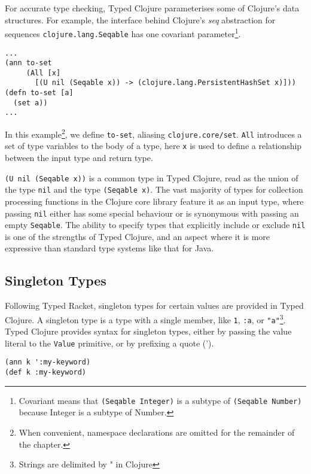 For accurate type checking, Typed Clojure parameterises some of Clojure's data structures. For example,
the interface behind Clojure's \emph{seq} abstraction for sequences \lstinline|clojure.lang.Seqable| has one 
covariant parameter\footnote{Covariant means that \lstinline|(Seqable Integer)| is a subtype of \lstinline|(Seqable Number)|
because Integer is a subtype of Number.}.

\begin{lstlisting}[caption=Polymorphism in Typed Clojure]
...
(ann to-set 
     (All [x]
       [(U nil (Seqable x)) -> (clojure.lang.PersistentHashSet x)]))
(defn to-set [a]
  (set a))
...
\end{lstlisting}

In this example\footnote{When convenient, namespace declarations are omitted for the remainder of the chapter.}, 
we define \lstinline|to-set|, aliasing \lstinline|clojure.core/set|.
\lstinline|All| introduces a set of type variables to the body of a type,
here \lstinline|x| is used to define a relationship between the input type and return type.

\lstinline|(U nil (Seqable x))| is a common type in Typed Clojure, read as the union
of the type \lstinline|nil| and the type \lstinline|(Seqable x)|.
The vast majority of types for collection processing functions in the Clojure core library feature
it as an input type, where passing \lstinline|nil| either has some special behaviour 
or is synonymous with passing an empty \lstinline|Seqable|.
The ability to specify types that explicitly include or exclude \lstinline|nil| is one of the strengths
of Typed Clojure, and an aspect where it is more expressive than standard type systems like that for Java.

\subsection{Singleton Types}

Following Typed Racket, singleton types for certain values are provided
in Typed Clojure.
A singleton type is a type with a single member, like \lstinline|1|,
\lstinline|:a|, or \lstinline|"a"|\footnote{Strings are delimited by " in Clojure}.
Typed Clojure provides syntax for singleton types, either by passing
the value literal to the \lstinline|Value| primitive, or by prefixing
a quote (').

\begin{lstlisting}[caption=Singleton Types, label=lst:singletoneeg]
(ann k ':my-keyword)
(def k :my-keyword)
\end{lstlisting}

